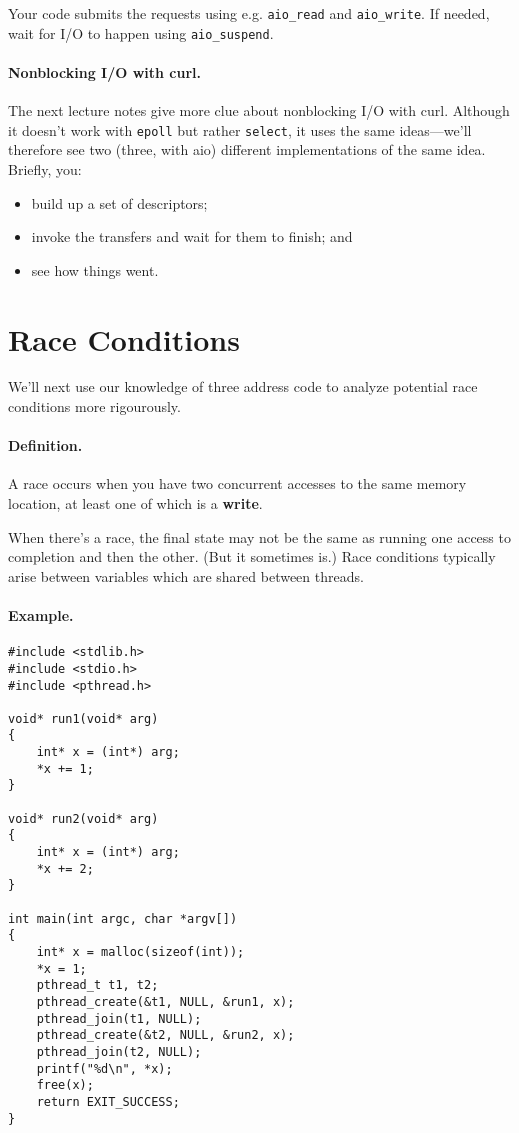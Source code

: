 \documentclass[11pt]{article}
\begin{document}
Your code submits the requests using e.g. {\tt aio\_read} and {\tt aio\_write}.
If needed, wait for I/O to happen using {\tt aio\_suspend}.

\paragraph{Nonblocking I/O with curl.} The next lecture notes give more clue
about nonblocking I/O with curl. Although it doesn't work with {\tt epoll}
but rather {\tt select}, it uses the same ideas---we'll therefore see two
(three, with aio) different implementations of the same idea. 
Briefly, you:
\begin{itemize}
\item build up a set of descriptors;
\item invoke the transfers and wait for them to finish; and
\item see how things went.
\end{itemize}

\section*{Race Conditions}
We'll next use our knowledge of three address code to analyze
potential race conditions more rigourously.

\paragraph{Definition.} A race occurs when you have two concurrent accesses to the
same memory location, at least one of which is a {\bf write}.

When there's a race, the final state may not be the same as running
one access to completion and then the other. (But it sometimes is.)
Race conditions typically arise between variables which are shared
between threads.

\paragraph{Example.}
\begin{lstlisting}
#include <stdlib.h>
#include <stdio.h>
#include <pthread.h>

void* run1(void* arg)
{
    int* x = (int*) arg;
    *x += 1;
}

void* run2(void* arg)
{
    int* x = (int*) arg;
    *x += 2;
}

int main(int argc, char *argv[])
{
    int* x = malloc(sizeof(int));
    *x = 1;
    pthread_t t1, t2;
    pthread_create(&t1, NULL, &run1, x);
    pthread_join(t1, NULL);
    pthread_create(&t2, NULL, &run2, x);
    pthread_join(t2, NULL);
    printf("%d\n", *x);
    free(x);
    return EXIT_SUCCESS;
}
\end{lstlisting}
\end{document}
